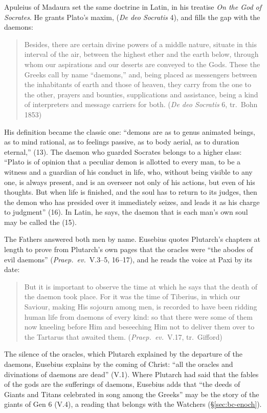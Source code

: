 Apuleius of Madaura set the same doctrine in Latin, in his treatise
\emph{On the God of Socrates}. He grants Plato's maxim,  (\emph{De deo Socratis} 4), and fills the gap
with the daemons:
\begin{quote}
Besides, there are certain divine powers of a middle nature, situate in
this interval of the air, between the highest ether and the earth
below, through whom our aspirations and our deserts are conveyed to the
Gods. These the Greeks call by name ``daemons,'' and, being placed as
messengers between the inhabitants of earth and those of heaven, they
carry from the one to the other, prayers and bounties, supplications and
assistance, being a kind of interpreters and message carriers for both.
(\emph{De deo Socratis} 6, tr.\ Bohn 1853)
\end{quote}
His definition became the classic one: ``demons are as to genus animated
beings, as to mind rational, as to feelings passive, as to body aerial,
as to duration eternal,''  (13). The
daemon who guarded Socrates belongs to a higher class: ``Plato is of
opinion that a peculiar demon is allotted to every man, to be a witness
and a guardian of his conduct in life, who, without being visible to any
one, is always present, and is an overseer not only of his actions, but
even of his thoughts. But when life is finished, and the soul has to
return to its judges, then the demon who has presided over it
immediately seizes, and leads it as his charge to judgment'' (16). In
Latin, he says, the daemon that is each man's own soul may be called the
 (15).

The Fathers answered both men by name. Eusebius quotes Plutarch's
chapters at length to prove from Plutarch's own pages that the oracles were
``the abodes of evil daemons'' (\emph{Praep.\ ev.}\ V.3--5, 16--17), and
he reads the voice at Paxi by its date:
\begin{quote}
But it is important to observe the time at which he says that the death
of the daemon took place. For it was the time of Tiberius, in which our
Saviour, making His sojourn among men, is recorded to have been ridding
human life from daemons of every kind: so that there were some of them
now kneeling before Him and beseeching Him not to deliver them over to
the Tartarus that awaited them. (\emph{Praep.\ ev.}\ V.17, tr.\ Gifford)
\end{quote}
The silence of the oracles, which Plutarch explained by the departure of
the daemons, Eusebius explains by the coming of Christ: ``all the
oracles and divinations of daemons are dead'' (V.1). Where Plutarch had said that
the fables of the gods are the sufferings of daemons, Eusebius adds that
``the deeds of Giants and Titans celebrated in song among the Greeks''
may be the story of the giants of Gen 6 (V.4), a reading that belongs
with the Watchers (\S\ref{sec:bc-enoch}).

